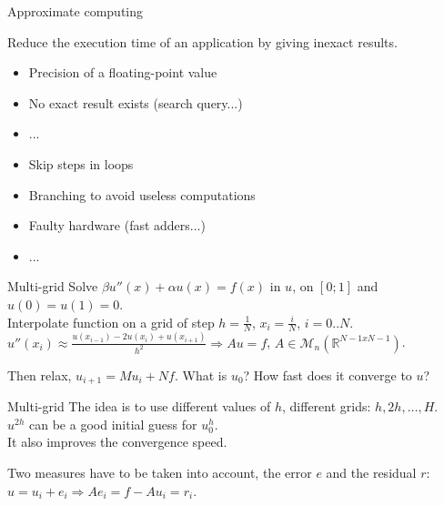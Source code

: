 \documentclass{beamer}
\begin{document}
\begin{frame}

  \begin{center}
    \Huge
    Approximate computing
  \end{center}
  Reduce the execution time of an application by giving inexact results.
  \pause
  \begin{itemize}
    \item Precision of a floating-point value
    \item No exact result exists (search query...)
    \item ...
  \end{itemize}
  \pause
  \begin{itemize}
   \item Skip steps in loops
   \item Branching to avoid useless computations
   \item Faulty hardware (fast adders...)
   \item ...
  \end{itemize}

\end{frame}

\begin{frame}{Multi-grid}
 Solve $\beta u''(x)+\alpha u(x)=f(x)$ in $u$, on $[0;1]$ and $u(0)=u(1)=0$.\\ \vspace{0.3cm}
 Interpolate function on a grid of step $h=\frac{1}{N}$, $x_i = \frac{i}{N}$, $i=0..N$.\\
 $u''(x_i) \approx \frac{u(x_{i-1})-2u(x_i)+u(x_{i+1})}{h^2} \Rightarrow Au = f$, $A \in \mathcal{M}_n(\mathbb{R}^{N-1xN-1})$.\\ \vspace{0.3cm}
 
 Then relax, $u_{i+1} = M u_{i} + N f$. What is $u_{0}$? How fast does it converge to $u$?
\end{frame}

\begin{frame}{Multi-grid}
 The idea is to use different values of $h$, different grids: $h,2h,\dots,H$.\\
 $u^{2h}$ can be a good initial guess for $u^h_0$.\\
 It also improves the convergence speed.\vspace{0.5cm}
 
 Two measures have to be taken into account, the error $e$ and the residual $r$: $u = u_i + e_i \Rightarrow Ae_i = f-Au_i = r_i$.
 
\end{frame}
\end{document}
